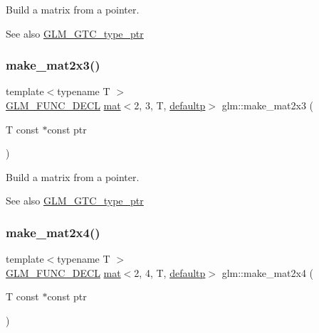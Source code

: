 Build a matrix from a pointer. \begin{DoxySeeAlso}{See also}
\hyperlink{group__gtc__type__ptr}{G\+L\+M\+\_\+\+G\+T\+C\+\_\+type\+\_\+ptr} 
\end{DoxySeeAlso}
\mbox{\label{group__gtc__type__ptr_ga21982104164789cf8985483aaefc25e8}} 
\subsubsection{\texorpdfstring{make\+\_\+mat2x3()}{make\_mat2x3()}}
{\footnotesize\ttfamily template$<$typename T $>$ \\
\hyperlink{setup_8hpp_ab2d052de21a70539923e9bcbf6e83a51}{G\+L\+M\+\_\+\+F\+U\+N\+C\+\_\+\+D\+E\+CL} \hyperlink{structglm_1_1mat}{mat}$<$2, 3, T, \hyperlink{namespaceglm_a36ed105b07c7746804d7fdc7cc90ff25a9d21ccd8b5a009ec7eb7677befc3bf51}{defaultp}$>$ glm\+::make\+\_\+mat2x3 (\begin{DoxyParamCaption}\item[{T const $\ast$const}]{ptr }\end{DoxyParamCaption})}

Build a matrix from a pointer. \begin{DoxySeeAlso}{See also}
\hyperlink{group__gtc__type__ptr}{G\+L\+M\+\_\+\+G\+T\+C\+\_\+type\+\_\+ptr} 
\end{DoxySeeAlso}
\mbox{\label{group__gtc__type__ptr_ga078b862c90b0e9a79ed43a58997d8388}} 
\subsubsection{\texorpdfstring{make\+\_\+mat2x4()}{make\_mat2x4()}}
{\footnotesize\ttfamily template$<$typename T $>$ \\
\hyperlink{setup_8hpp_ab2d052de21a70539923e9bcbf6e83a51}{G\+L\+M\+\_\+\+F\+U\+N\+C\+\_\+\+D\+E\+CL} \hyperlink{structglm_1_1mat}{mat}$<$2, 4, T, \hyperlink{namespaceglm_a36ed105b07c7746804d7fdc7cc90ff25a9d21ccd8b5a009ec7eb7677befc3bf51}{defaultp}$>$ glm\+::make\+\_\+mat2x4 (\begin{DoxyParamCaption}\item[{T const $\ast$const}]{ptr }\end{DoxyParamCaption})}

